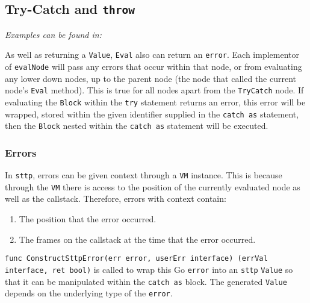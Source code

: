 \cprotect\subsection{Try-Catch and \verb|throw|}

\textit{Examples can be found in: }

As well as returning a \verb|Value|, \verb|Eval| also can return an \texttt{error}. Each implementor of \verb|evalNode| will pass any errors that occur within that node, or from evaluating any lower down nodes, up to the parent node (the node that called the current node's \verb|Eval| method). This is true for all nodes apart from the \verb|TryCatch| node. If evaluating the \verb|Block| within the \verb|try| statement returns an error, this error will be wrapped, stored within the given identifier supplied in the \verb|catch as| statement, then the \verb|Block| nested within the \verb|catch as| statement will be executed.

\subsubsection{Errors}

\label{sec:development-try-catch-throw-errors-context}
\begin{definition}
    In \verb|sttp|, errors can be given context through a \verb|VM| instance. This is because through the \verb|VM| there is access to the position of the currently evaluated node as well as the callstack. Therefore, errors with context contain:
    \begin{enumerate}
        \item The position that the error occurred.
        \item The frames on the callstack at the time that the error occurred.
    \end{enumerate}
\end{definition}

\texttt{func ConstructSttpError(err error, userErr interface{}) (errVal interface{}, ret bool)} is called to wrap this Go \texttt{error} into an \verb|sttp| \verb|Value| so that it can be manipulated within the \verb|catch as| block. The generated \verb|Value| depends on the underlying type of the \texttt{error}.

